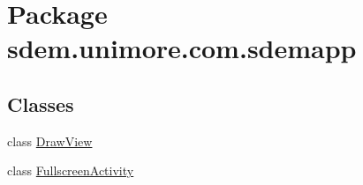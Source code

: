 \hypertarget{namespacesdem_1_1unimore_1_1com_1_1sdemapp}{\section{Package sdem.\+unimore.\+com.\+sdemapp}
\label{namespacesdem_1_1unimore_1_1com_1_1sdemapp}
}
\subsection*{Classes}
\begin{DoxyCompactItemize}
\item 
class \hyperlink{classsdem_1_1unimore_1_1com_1_1sdemapp_1_1_draw_view}{Draw\+View}
\item 
class \hyperlink{classsdem_1_1unimore_1_1com_1_1sdemapp_1_1_fullscreen_activity}{Fullscreen\+Activity}
\end{DoxyCompactItemize}
